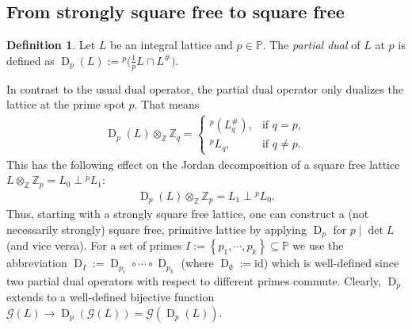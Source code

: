 \documentclass{amsart}
\theoremstyle{definition}
\newtheorem{defn}[thm]{Definition}
\theoremstyle{remark}
\def\ZZ{\mathbb{Z}}
\def\PP{\mathbb{P}}
\def\CG{{\mathcal G}}
\def\CG{{\mathcal G}}
\DeclareMathOperator{\D}{D}
\begin{document}
\subsection{From strongly square free to square free}
\begin{defn}
Let $L$ be an integral lattice and $p \in \PP$. The \emph{partial dual} of $L$ at $p$ is defined as $\D_p(L):={}^{p}\!{(\tfrac{1}{p}L \cap L^{\#}})$.
\end{defn}
In contrast to the usual dual operator, the partial dual operator only dualizes the lattice at the prime spot $p$. That means
\begin{align*}
 \D_p(L) \otimes_{\ZZ} \ZZ_q =
 \begin{cases}
  {}^{p}\!{\left(L_q^{\#}\right)}, & \text{if $q = p$}, \\
  {}^{p}\!{L_q},      & \text{if $q \neq p$}.
 \end{cases}
\end{align*}
This has the following effect on the Jordan decomposition of a square free lattice $L \otimes_{\ZZ} \ZZ_p = L_0 \perp {}^{p}{L_1}$:
\begin{align*}
 \D_p(L) \otimes_{\ZZ} \ZZ_p = L_1 \perp {}^{p}{L_0}.
\end{align*}
Thus, starting with a strongly square free lattice, one can construct a (not necessarily strongly) square free, primitive lattice by applying $\D_p$ for $p \mid \det L$ (and vice versa).
For a set of primes $I:=\left\{p_1,\cdots,p_k \right\} \subseteq \PP$ we use the abbreviation $\D_I:=\D_{p_1} \circ \cdots \circ \D_{p_k}$ (where $\D_\emptyset := \mathrm{id}$)
which is well-defined since two partial dual operators with respect to different primes commute.
Clearly, $\D_p$ extends to a well-defined bijective function $\CG(L) \longrightarrow \D_p(\CG(L))=\CG(\D_p(L))$.
\end{document}
